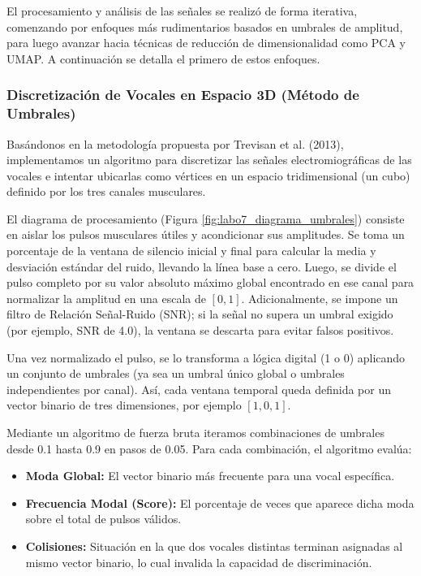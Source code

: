 El procesamiento y análisis de las señales se realizó de forma iterativa, comenzando por enfoques más rudimentarios basados en umbrales de amplitud, para luego avanzar hacia técnicas de reducción de dimensionalidad como PCA y UMAP. A continuación se detalla el primero de estos enfoques.

\subsubsection{Discretización de Vocales en Espacio 3D (Método de Umbrales)}

Basándonos en la metodología propuesta por Trevisan et al. (2013), implementamos un algoritmo para discretizar las señales electromiográficas de las vocales e intentar ubicarlas como vértices en un espacio tridimensional (un cubo) definido por los tres canales musculares.

El diagrama de procesamiento (Figura \ref{fig:labo7_diagrama_umbrales}) consiste en aislar los pulsos musculares útiles y acondicionar sus amplitudes. Se toma un porcentaje de la ventana de silencio inicial y final para calcular la media y desviación estándar del ruido, llevando la línea base a cero. Luego, se divide el pulso completo por su valor absoluto máximo global encontrado en ese canal para normalizar la amplitud en una escala de $[0, 1]$. Adicionalmente, se impone un filtro de Relación Señal-Ruido (SNR); si la señal no supera un umbral exigido (por ejemplo, SNR de 4.0), la ventana se descarta para evitar falsos positivos.

Una vez normalizado el pulso, se lo transforma a lógica digital (1 o 0) aplicando un conjunto de umbrales (ya sea un umbral único global o umbrales independientes por canal). Así, cada ventana temporal queda definida por un vector binario de tres dimensiones, por ejemplo $[1, 0, 1]$. 

Mediante un algoritmo de fuerza bruta iteramos combinaciones de umbrales desde 0.1 hasta 0.9 en pasos de 0.05. Para cada combinación, el algoritmo evalúa:
\begin{itemize}
    \item \textbf{Moda Global:} El vector binario más frecuente para una vocal específica.
    \item \textbf{Frecuencia Modal (Score):} El porcentaje de veces que aparece dicha moda sobre el total de pulsos válidos.
    \item \textbf{Colisiones:} Situación en la que dos vocales distintas terminan asignadas al mismo vector binario, lo cual invalida la capacidad de discriminación.
\end{itemize}

